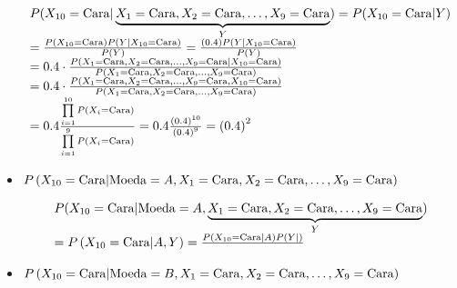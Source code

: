 \begin{itemize}
  \[\begin{array}{l}
  P({X_{10}} = {\rm{Cara}}|\underbrace {{X_1} = {\rm{Cara}},{X_2} = {\rm{Cara}}, \ldots ,{X_9} = {\rm{Cara}}}_Y) = P({X_{10}} = {\rm{Cara}}|Y)\\
   = \frac{{P\left( {{X_{10}} = {\rm{Cara}}} \right)P\left( {Y|{X_{10}} = {\rm{Cara}}} \right)}}{{P\left( Y \right)}} = \frac{{\left( {0.4} \right)P\left( {Y|{X_{10}} = {\rm{Cara}}} \right)}}{{P\left( Y \right)}}\\
   = 0.4 \cdot \frac{{P\left( {{X_1} = {\rm{Cara}},{X_2} = {\rm{Cara}}, \ldots ,{X_9} = {\rm{Cara}}|{X_{10}} = {\rm{Cara}}} \right)}}{{P\left( {{X_1} = {\rm{Cara}},{X_2} = {\rm{Cara}}, \ldots ,{X_9} = {\rm{Cara}}} \right)}}\\
   = 0.4 \cdot \frac{{P\left( {{X_1} = {\rm{Cara}},{X_2} = {\rm{Cara}}, \ldots ,{X_9} = {\rm{Cara}},{X_{10}} = {\rm{Cara}}} \right)}}{{P\left( {{X_1} = {\rm{Cara}},{X_2} = {\rm{Cara}}, \ldots ,{X_9} = {\rm{Cara}}} \right)}}\\
   = 0.4\frac{{\prod\limits_{i = 1}^{10} {P\left( {{X_i} = {\rm{Cara}}} \right)} }}{{\prod\limits_{i = 1}^9 {P\left( {{X_i} = {\rm{Cara}}} \right)} }} = 0.4\frac{{{{\left( {0.4} \right)}^{10}}}}{{{{\left( {0.4} \right)}^9}}} = {\left( {0.4} \right)^2}
  \end{array}\]


  \item $P\left( {{X_{10}} = {\rm{Cara}}|{\rm{Moeda}} = A,{X_1} = {\rm{Cara}},{X_2} = {\rm{Cara}}, \ldots ,{X_9} = {\rm{Cara}}} \right)$

  \[\begin{array}{l}
  P({X_{10}} = {\rm{Cara}}|{\rm{Moeda}} = A,\underbrace {{X_1} = {\rm{Cara}},{X_2} = {\rm{Cara}}, \ldots ,{X_9} = {\rm{Cara}}}_Y)\\
   = P\left( {{X_{10}} = {\rm{Cara}}|A,Y} \right) = \frac{{P\left( {{X_{10}} = {\rm{Cara}}|A} \right)P\left( {Y|} \right)}}{{}}
  \end{array}\]

  \item $P\left( {{X_{10}} = {\rm{Cara}}|{\rm{Moeda}} = B,{X_1} = {\rm{Cara}},{X_2} = {\rm{Cara}}, \ldots ,{X_9} = {\rm{Cara}}} \right)$


\end{itemize}
